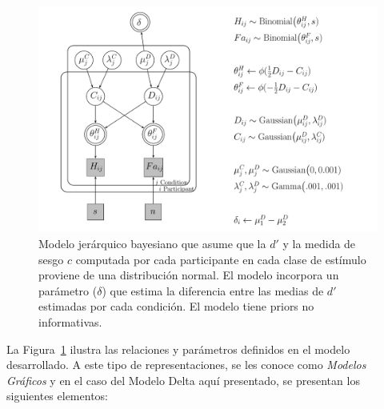 \begin{figure}[th]
\centering
\includegraphics[width=1.1\textwidth]{Figures/Model_Delta_Diff_D}
\caption[Modelo Delta: Modelo jerárquico bayesiano para revisar las diferencias en $d'$ entre clases de estímulos]{Modelo jerárquico bayesiano que asume que la $d'$ y la medida de sesgo $c$ computada por cada participante en cada clase de estímulo proviene de una distribución normal. El modelo incorpora un parámetro ($\delta$) que estima la diferencia entre las medias de $d'$ estimadas por cada condición. El modelo tiene priors no informativas.}
\label{fig:Mod_Delta}
\end{figure}

La Figura~\ref{fig:Mod_Delta} ilustra las relaciones y parámetros definidos en el modelo desarrollado. A este tipo de representaciones, se les conoce como \textit{Modelos Gráficos} y en el caso del Modelo Delta aquí presentado, se presentan los siguientes elementos:\\


